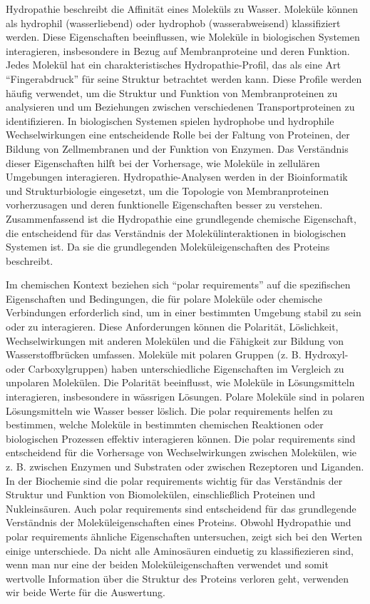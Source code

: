 \documentclass[german,version-2022-01]{uzl-thesis}
\begin{document}
Hydropathie beschreibt die Affinit\"at eines Molek\"uls zu Wasser. Molek\"ule k\"onnen als hydrophil (wasserliebend) oder hydrophob (wasserabweisend) klassifiziert werden. Diese Eigenschaften beeinflussen, wie Molek\"ule in biologischen Systemen interagieren, insbesondere in Bezug auf Membranproteine und deren Funktion. Jedes Molek\"ul hat ein charakteristisches Hydropathie-Profil, das als eine Art "`Fingerabdruck"' f\"ur seine Struktur betrachtet werden kann. Diese Profile werden h\"aufig verwendet, um die Struktur und Funktion von Membranproteinen zu analysieren und um Beziehungen zwischen verschiedenen Transportproteinen zu identifizieren. In biologischen Systemen spielen hydrophobe und hydrophile Wechselwirkungen eine entscheidende Rolle bei der Faltung von Proteinen, der Bildung von Zellmembranen und der Funktion von Enzymen. Das Verst\"andnis dieser Eigenschaften hilft bei der Vorhersage, wie Molek\"ule in zellul\"aren Umgebungen interagieren. Hydropathie-Analysen werden in der Bioinformatik und Strukturbiologie eingesetzt, um die Topologie von Membranproteinen vorherzusagen und deren funktionelle Eigenschaften besser zu verstehen. Zusammenfassend ist die Hydropathie eine grundlegende chemische Eigenschaft, die entscheidend f\"ur das Verst\"andnis der Molek\"ulinteraktionen in biologischen Systemen ist. Da sie die grundlegenden Molek\"uleigenschaften des Proteins beschreibt. 

Im chemischen Kontext beziehen sich "`polar requirements"' auf die spezifischen Eigenschaften und Bedingungen, die f\"ur polare Molek\"ule oder chemische Verbindungen erforderlich sind, um in einer bestimmten Umgebung stabil zu sein oder zu interagieren. Diese Anforderungen k\"onnen die Polarit\"at, L\"oslichkeit, Wechselwirkungen mit anderen Molek\"ulen und die F\"ahigkeit zur Bildung von Wasserstoffbr\"ucken umfassen. Molek\"ule mit polaren Gruppen (z. B. Hydroxyl- oder Carboxylgruppen) haben unterschiedliche Eigenschaften im Vergleich zu unpolaren Molek\"ulen. Die Polarit\"at beeinflusst, wie Molek\"ule in L\"osungsmitteln interagieren, insbesondere in w\"assrigen L\"osungen. Polare Molek\"ule sind in polaren L\"osungsmitteln wie Wasser besser l\"oslich. Die polar requirements helfen zu bestimmen, welche Molek\"ule in bestimmten chemischen Reaktionen oder biologischen Prozessen effektiv interagieren k\"onnen. Die polar requirements sind entscheidend f\"ur die Vorhersage von Wechselwirkungen zwischen Molek\"ulen, wie z. B. zwischen Enzymen und Substraten oder zwischen Rezeptoren und Liganden. In der Biochemie sind die polar requirements wichtig f\"ur das Verst\"andnis der Struktur und Funktion von Biomolek\"ulen, einschlie\ss{}lich Proteinen und Nukleins\"auren. Auch polar requirements sind entscheidend f\"ur das grundlegende Verst\"andnis der Molek\"uleigenschaften eines Proteins. Obwohl Hydropathie und polar requirements \"ahnliche Eigenschaften untersuchen, zeigt sich bei den Werten einige unterschiede. Da nicht alle Aminos\"auren einduetig zu klassifiezieren sind, wenn man nur eine der beiden Molek\"uleigenschaften verwendet und somit wertvolle Information \"uber die Struktur des Proteins verloren geht, verwenden wir beide Werte f\"ur die Auswertung. 
\end{document}

